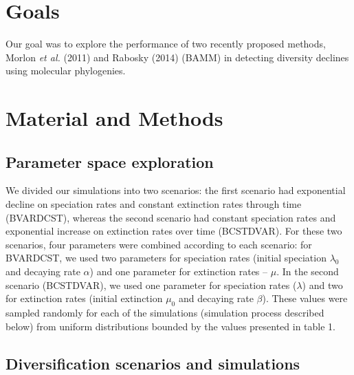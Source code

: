 \documentclass[12pt,]{article}
\begin{document}
\section{Goals}\label{goals}

Our goal was to explore the performance of two recently proposed
methods, Morlon \emph{et al.} (2011) and Rabosky (2014) (BAMM) in
detecting diversity declines using molecular phylogenies.

\section{Material and Methods}\label{material-and-methods}

\subsection{Parameter space
exploration}\label{parameter-space-exploration}

We divided our simulations into two scenarios: the first scenario had
exponential decline on speciation rates and constant extinction rates
through time (BVARDCST), whereas the second scenario had constant
speciation rates and exponential increase on extinction rates over time
(BCSTDVAR). For these two scenarios, four parameters were combined
according to each scenario: for BVARDCST, we used two parameters for
speciation rates (initial speciation \(\lambda_0\) and decaying rate
\(\alpha\)) and one parameter for extinction rates -- \(\mu\). In the
second scenario (BCSTDVAR), we used one parameter for speciation rates
(\(\lambda\)) and two for extinction rates (initial extinction \(\mu_0\)
and decaying rate \(\beta\)). These values were sampled randomly for
each of the simulations (simulation process described below) from
uniform distributions bounded by the values presented in table 1.

\subsection{Diversification scenarios and
simulations}\label{diversification-scenarios-and-simulations}
\end{document}
